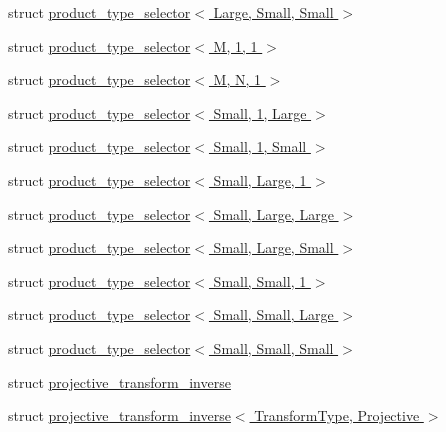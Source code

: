 \begin{DoxyCompactItemize}
\item 
struct \hyperlink{struct_eigen_1_1internal_1_1product__type__selector_3_01_large_00_01_small_00_01_small_01_4}{product\+\_\+type\+\_\+selector$<$ Large, Small, Small $>$}
\item 
struct \hyperlink{struct_eigen_1_1internal_1_1product__type__selector_3_01_m_00_011_00_011_01_4}{product\+\_\+type\+\_\+selector$<$ M, 1, 1 $>$}
\item 
struct \hyperlink{struct_eigen_1_1internal_1_1product__type__selector_3_01_m_00_01_n_00_011_01_4}{product\+\_\+type\+\_\+selector$<$ M, N, 1 $>$}
\item 
struct \hyperlink{struct_eigen_1_1internal_1_1product__type__selector_3_01_small_00_011_00_01_large_01_4}{product\+\_\+type\+\_\+selector$<$ Small, 1, Large $>$}
\item 
struct \hyperlink{struct_eigen_1_1internal_1_1product__type__selector_3_01_small_00_011_00_01_small_01_4}{product\+\_\+type\+\_\+selector$<$ Small, 1, Small $>$}
\item 
struct \hyperlink{struct_eigen_1_1internal_1_1product__type__selector_3_01_small_00_01_large_00_011_01_4}{product\+\_\+type\+\_\+selector$<$ Small, Large, 1 $>$}
\item 
struct \hyperlink{struct_eigen_1_1internal_1_1product__type__selector_3_01_small_00_01_large_00_01_large_01_4}{product\+\_\+type\+\_\+selector$<$ Small, Large, Large $>$}
\item 
struct \hyperlink{struct_eigen_1_1internal_1_1product__type__selector_3_01_small_00_01_large_00_01_small_01_4}{product\+\_\+type\+\_\+selector$<$ Small, Large, Small $>$}
\item 
struct \hyperlink{struct_eigen_1_1internal_1_1product__type__selector_3_01_small_00_01_small_00_011_01_4}{product\+\_\+type\+\_\+selector$<$ Small, Small, 1 $>$}
\item 
struct \hyperlink{struct_eigen_1_1internal_1_1product__type__selector_3_01_small_00_01_small_00_01_large_01_4}{product\+\_\+type\+\_\+selector$<$ Small, Small, Large $>$}
\item 
struct \hyperlink{struct_eigen_1_1internal_1_1product__type__selector_3_01_small_00_01_small_00_01_small_01_4}{product\+\_\+type\+\_\+selector$<$ Small, Small, Small $>$}
\item 
struct \hyperlink{struct_eigen_1_1internal_1_1projective__transform__inverse}{projective\+\_\+transform\+\_\+inverse}
\item 
struct \hyperlink{struct_eigen_1_1internal_1_1projective__transform__inverse_3_01_transform_type_00_01_projective_01_4}{projective\+\_\+transform\+\_\+inverse$<$ Transform\+Type, Projective $>$}

\end{DoxyCompactItemize}
